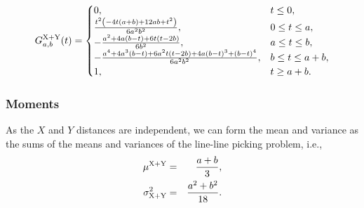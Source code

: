 \begin{equation}
 G^{\rm X+Y}_{a,b}(t) =
 \begin{cases}
 0, & t \leq 0, \\
\frac{t^2 \left(-4 t (a+b)+12 a b+t^2\right)}{6 a^2 b^2}, & 0 \leq t \leq a, \\
-\frac{a^2+4 a (b-t)+6 t (t-2 b)}{6 b^2}, & a \leq t \leq  b, \\
-\frac{a^4+4 a^3 (b-t)+6 a^2 t (t-2 b)+4 a (b-t)^3+(b-t)^4}{6 a^2 b^2}, & b \leq t  \leq  a + b,\\
 1, & t \geq a + b.
 \end{cases}
  \label{eq:manhattan_cdf}
\end{equation}


\subsubsection{Moments}

As the $X$ and $Y$ distances are independent, we can form the mean and
variance as the sums of the means and variances of the line-line
picking problem, i.e.,
\begin{eqnarray}
  \mu^{\rm X+Y} & = & \frac{a+b}{3}, \\
  \label{eq:rect_man_mean}
  \sigma^2_{\rm X+Y}
      & = & \frac{a^{2} + b^2}{18}.
  \label{eq:rect_man_var}
\end{eqnarray}
